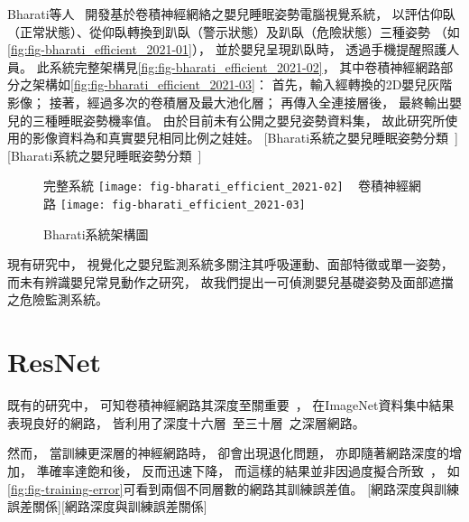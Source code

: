 \documentclass[class=NCU_thesis, crop=false]{standalone}
\begin{document}
Bharati等人~\cite{bharati_efficient_2021}
開發基於卷積神經網絡之嬰兒睡眠姿勢電腦視覺系統，
以評估仰臥（正常狀態）、從仰臥轉換到趴臥（警示狀態）及趴臥（危險狀態）三種姿勢
（如\cref{fig:fig-bharati_efficient_2021-01}），
並於嬰兒呈現趴臥時，
透過手機提醒照護人員。
此系統完整架構見\cref{fig:fig-bharati_efficient_2021-02}，
其中卷積神經網路部分之架構如\cref{fig:fig-bharati_efficient_2021-03}：
首先，輸入經轉換的2D嬰兒灰階影像；
接著，經過多次的卷積層及最大池化層；
再傳入全連接層後，
最終輸出嬰兒的三種睡眠姿勢機率值。
由於目前未有公開之嬰兒姿勢資料集，
故此研究所使用的影像資料為和真實嬰兒相同比例之娃娃。
[Bharati系統之嬰兒睡眠姿勢分類~\cite{bharati_efficient_2021}][Bharati系統之嬰兒睡眠姿勢分類~\cite{bharati_efficient_2021}]
\begin{figure}[!hbt]
    \centering
    \subcaptionbox
        {完整系統
        \label{fig:fig-bharati_efficient_2021-02}}
        {\texttt{[image: fig-bharati\_efficient\_2021-02]}}
    ~
    \subcaptionbox
        {卷積神經網路
        \label{fig:fig-bharati_efficient_2021-03}}
        {\texttt{[image: fig-bharati\_efficient\_2021-03]}}
    \caption{Bharati系統架構圖~\cite{bharati_efficient_2021}}
    \label{fig:fig-bharati_efficient_2021}
\end{figure}

現有研究中，
視覺化之嬰兒監測系統多關注其呼吸運動、面部特徵或單一姿勢，
而未有辨識嬰兒常見動作之研究，
故我們提出一可偵測嬰兒基礎姿勢及面部遮擋之危險監測系統。

\section{ResNet}
既有的研究中，
可知卷積神經網路其深度至關重要~\cite{simonyan_very_2015, szegedy_going_2015}，
在ImageNet資料集中結果表現良好的網路，
皆利用了深度十六層~\cite{simonyan_very_2015}至三十層~\cite{ioffe_batch_2015}之深層網路。

然而，
當訓練更深層的神經網路時，
卻會出現退化問題，
亦即隨著網路深度的增加，
準確率達飽和後，
反而迅速下降，
而這樣的結果並非因過度擬合所致~\cite{he_convolutional_2015, srivastava_highway_2015}，
如\cref{fig:fig-training-error}可看到兩個不同層數的網路其訓練誤差值。
[網路深度與訓練誤差關係][網路深度與訓練誤差關係]
\end{document}
